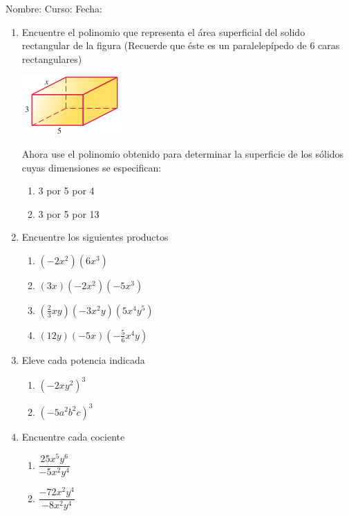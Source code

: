 \documentclass[letterpaper,fleqn]{article}
\newcommand{\LineaNombre}{%
\par
\vspace{\baselineskip}
Nombre:\hrulefill \; Curso: \underline{\hspace*{48pt}} \; Fecha: \underline{\hspace*{2.5cm}} \relax
\par}
\begin{document}
\LineaNombre
\begin{enumerate}
 \item Encuentre el polinomio que representa el área superficial del solido rectangular de la figura (Recuerde que \'{e}ste es un paralelep\'{i}pedo de 6 caras rectangulares)
\begin{center}
\includegraphics[scale=1]{Images/solido01.png} 
\end{center}
\noanswer
Ahora use el polinomio obtenido para determinar la superficie de los sólidos cuyas dimensiones se especifican:
\begin{enumerate}
\item 3 por 5 por 4\noanswer
\item 3 por 5 por 13\noanswer
\end{enumerate}
\item Encuentre los siguientes productos
\begin{enumerate}
\item $(-2x^{2})(6x^{3})$\noanswer
\item $(3x)(-2x^{2})(-5x^{3})$\noanswer
\item $(\frac{2}{3}xy)(-3x^{2}y)(5x^{4}y^{5})$\noanswer
\item $(12y)(-5x)(-\frac{5}{6}x^{4}y)$\noanswer
\end{enumerate}
\item Eleve cada potencia indicada
\begin{enumerate}
\item $(-2xy^{2})^{3}$\noanswer
\item $(-5a^{2}b^{2}c)^{3}$\noanswer
\end{enumerate}
\item Encuentre cada cociente
\begin{enumerate}
\item $\dfrac{25x^{5}y^{6}}{-5x^{2}y^{4}}$\noanswer
\item $\dfrac{-72x^{2}y^{4}}{-8x^{2}y^{4}}$\noanswer
\end{enumerate}
 \end{enumerate}
\end{document}
